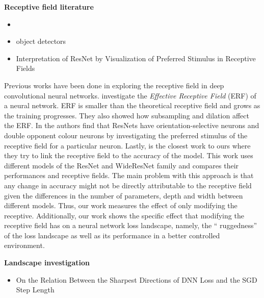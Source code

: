 \textbf{Receptive field literature}
\begin{itemize}
  \item \cite{luoUnderstandingEffectiveReceptive2016}
    \item object detectors \cite{zhouObjectDetectorsEmerge2015}
      \item Interpretation of ResNet by Visualization of Preferred Stimulus in Receptive Fields \cite{kobayashiInterpretationResNetVisualization2020}
\end{itemize}
 Previous works have been done in exploring the receptive field in deep convolutional neural networks.
 \cite{luoUnderstandingEffectiveReceptive2016}  investigate the \textit{Effective Receptive Field} (ERF) of a
 neural network. ERF is smaller than the theoretical receptive field and grows as the training progresses. They also
 showed how subsampling and dilation affect the ERF. In \cite{kobayashiInterpretationResNetVisualization2020} the
 authors find that ResNets have orientation-selective neurons and double opponent colour neurons by investigating the
 preferred stimulus of the receptive field for a particular neuron. Lastly, \citep{kimDeadPixelTest2023} is the closest work
 to ours where they try to link the receptive field to the accuracy of the model. This work uses different models of the
 ResNet and WideResNet family and compares their performances and receptive fields. The main problem with this approach
 is that any change in accuracy might not be directly attributable to the receptive field given the differences in
 the number of parameters, depth and width between different models. Thus, our work measures the effect of only
 modifying the receptive. Additionally, our work shows the specific effect that modifying the receptive field has on a
 neural network loss landscape, namely, the `` ruggedness'' of the loss landscape as well as its performance in a better
 controlled environment.



\textbf{Landscape investigation}
\begin{itemize}
  \item On the Relation Between the Sharpest Directions of DNN Loss and the SGD Step Length \cite{jastrzebskiRelationSharpestDirections2019}
\end{itemize}

